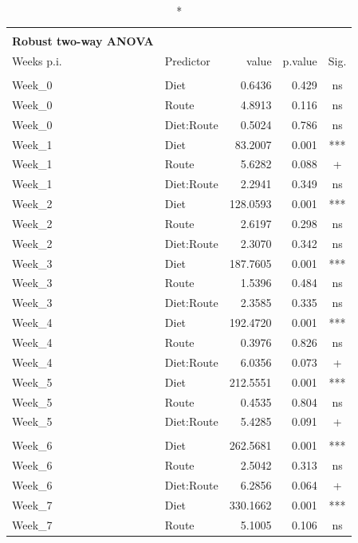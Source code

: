 \documentclass[
  12pt,
  letterpaper,
]{article}
\begin{document}
\begingroup
\fontsize{12.0pt}{14.4pt}\selectfont
\begin{longtable}{l|lrrc}
\caption*{
{\large \textbf{Appendix Table 91}} \\ 
{\small \textbf{Robust two-way ANOVA}}
} \\ 
\toprule
Weeks p.i. & {Predictor} & {value} & {p.value} & {Sig.} \\ 
\midrule\addlinespace[2.5pt]
\multicolumn{5}{l}{Pre-Infection} \\[2.5pt] 
\midrule\addlinespace[2.5pt]
Week\_0 & Diet & 0.6436 & 0.429 & ns \\ 
Week\_0 & Route & 4.8913 & 0.116 & ns \\ 
Week\_0 & Diet:Route & 0.5024 & 0.786 & ns \\ 
Week\_1 & Diet & 83.2007 & 0.001 & *** \\ 
Week\_1 & Route & 5.6282 & 0.088 & + \\ 
Week\_1 & Diet:Route & 2.2941 & 0.349 & ns \\ 
Week\_2 & Diet & 128.0593 & 0.001 & *** \\ 
Week\_2 & Route & 2.6197 & 0.298 & ns \\ 
Week\_2 & Diet:Route & 2.3070 & 0.342 & ns \\ 
Week\_3 & Diet & 187.7605 & 0.001 & *** \\ 
Week\_3 & Route & 1.5396 & 0.484 & ns \\ 
Week\_3 & Diet:Route & 2.3585 & 0.335 & ns \\ 
Week\_4 & Diet & 192.4720 & 0.001 & *** \\ 
Week\_4 & Route & 0.3976 & 0.826 & ns \\ 
Week\_4 & Diet:Route & 6.0356 & 0.073 & + \\ 
Week\_5 & Diet & 212.5551 & 0.001 & *** \\ 
Week\_5 & Route & 0.4535 & 0.804 & ns \\ 
Week\_5 & Diet:Route & 5.4285 & 0.091 & + \\ 
\midrule\addlinespace[2.5pt]
\multicolumn{5}{l}{Post-Infestion} \\[2.5pt] 
\midrule\addlinespace[2.5pt]
Week\_6 & Diet & 262.5681 & 0.001 & *** \\ 
Week\_6 & Route & 2.5042 & 0.313 & ns \\ 
Week\_6 & Diet:Route & 6.2856 & 0.064 & + \\ 
Week\_7 & Diet & 330.1662 & 0.001 & *** \\ 
Week\_7 & Route & 5.1005 & 0.106 & ns \\ 

\end{longtable}
\end{document}
